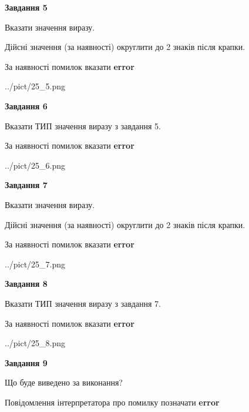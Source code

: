 \documentclass[11pt, ukrainian]{article}
\begin{document}
{\begin {large}
{\begin {center}\textbf{Завдання 5}\end {center}}\par
Вказати значення виразу. \par
Дійсні значення (за наявності) округлити до 2 знаків після крапки. \par
За наявності помилок вказати \textbf{error}

\begin{center}
	{../pict/25_5.png}
\end{center}
\newpage

{\begin {center}\textbf{Завдання 6}\end {center}}\par
Вказати ТИП значення виразу з завдання 5. \par
За наявності помилок вказати \textbf{error}

\begin{center}
	{../pict/25_6.png}
\end{center}
\newpage

{\begin {center}\textbf{Завдання 7}\end {center}}\par
Вказати значення виразу. \par
Дійсні значення (за наявності) округлити до 2 знаків після крапки. \par
За наявності помилок вказати \textbf{error}

\begin{center}
	{../pict/25_7.png}
\end{center}
\newpage

{\begin {center}\textbf{Завдання 8}\end {center}}\par
Вказати ТИП значення виразу з завдання 7. \par
За наявності помилок вказати \textbf{error}

\begin{center}
	{../pict/25_8.png}
\end{center}
\newpage

{\begin {center}\textbf{Завдання 9}\end {center}}\par
Що буде виведено за виконання? \par
Повідомлення інтерпретатора про помилку позначати \textbf{error}


\end{large}}
\end{document}
